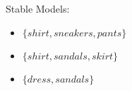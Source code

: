 \begin{Loesung}
{\begin{UList}
Stable Models:
\begin{itemize}
\item $\{\mathit{shirt},\mathit{sneakers},\mathit{pants}\}$
\item $\{\mathit{shirt},\mathit{sandals},\mathit{skirt}\}$
\item $\{\mathit{dress},\mathit{sandals}\}$
\end{itemize}
%
\item

\end{UList}}
\end{Loesung}

